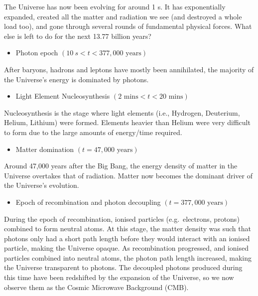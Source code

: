\documentclass[11pt,a4paper]{book}
\providecommand{\tightlist}{%
  \setlength{\itemsep}{0pt}\setlength{\parskip}{0pt}}
\begin{document}
The Universe has now been evolving for around 1 s. It has exponentially
expanded, created all the matter and radiation we see (and destroyed a
whole load too), and gone through several rounds of fundamental physical
forces. What else is left to do for the next 13.77 billion years?

\begin{itemize}
\tightlist
\item
  Photon epoch \((10~s < t < 377,000\text{ years})\)
\end{itemize}

After baryons, hadrons and leptons have mostly been annihilated, the
majority of the Universe's energy is dominated by photons.

\begin{itemize}
\tightlist
\item
  Light Element Nucleosynthesis \((2 \text{ mins} < t < 20\text{ mins})\)
\end{itemize}

Nucleosynthesis is the stage where light elements (i.e., Hydrogen,
Deuterium, Helium, Lithium) were formed. Elements heavier than Helium
were very difficult to form due to the large amounts of energy/time
required.

\begin{itemize}
\tightlist
\item
  Matter domination \((t = 47,000\text{ years})\)
\end{itemize}

Around 47,000 years after the Big Bang, the energy density of matter in
the Universe overtakes that of radiation. Matter now becomes the
dominant driver of the Universe's evolution.

\begin{itemize}
\tightlist
\item
  Epoch of recombination and photon decoupling \((t = 377,000\text{ years})\)
\end{itemize}

During the epoch of recombination, ionised particles (e.g.~electrons,
protons) combined to form neutral atoms. At this stage, the matter
density was such that photons only had a short path length before they
would interact with an ionised particle, making the Universe opaque. As
recombination progressed, and ionised particles combined into neutral
atoms, the photon path length increased, making the Universe transparent
to photons. The decoupled photons produced during this time have been
redshifted by the expansion of the Universe, so we now observe them as
the Cosmic Microwave Background (CMB).
\end{document}
